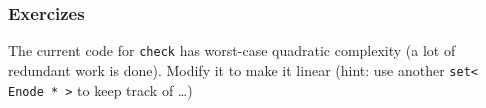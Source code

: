 \begin{frame}[fragile]
  \frametitle{Exercizes}

  \vfill
  The current code for \verb|check| has worst-case quadratic 
  complexity (a lot of redundant work is done).
  Modify it to make it linear (hint: use another \verb|set< Enode * >| to keep track of \ldots)
  \vfill

\end{frame}
